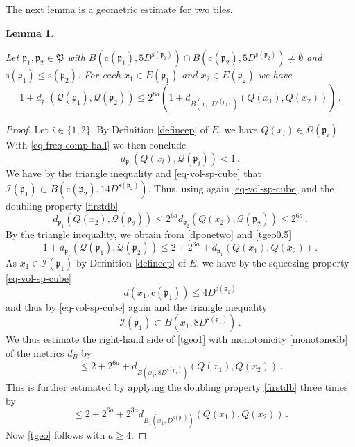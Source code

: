\documentclass[10pt,a4paper]{article}
\theoremstyle{plain}
\newtheorem{lemma}[theorem]{Lemma}
\theoremstyle{definition}
\numberwithin{equation}{subsection}
\newcommand{\fp}{{\mathfrak p}}
\newcommand{\fP}{{\mathfrak P}}
\newcommand{\pc}{{\mathrm{c}}}
\newcommand{\ps}{{\mathrm{s}}}
\newcommand{\fc}{{\Omega}}
\newcommand{\scI}{{\mathcal{I}}} %
\newcommand{\tQ}{{Q}}
\newcommand{\fcc}{{\mathcal{Q}}}
\newcommand{\lean}[1]{}
\newcommand{\uses}[1]{}
\newcommand{\leanok}{}
\begin{document}
The next lemma is a geometric estimate for two tiles.
\begin{lemma}\label{tile-uncertainty}
\leanok
\lean{Tile.uncertainty}
\uses{monotone-cube-metrics,tile-range-support}
    Let $\fp_1, \fp_2\in \fP$ with
    $B(\pc(\fp_1),5D^{\ps(\fp_1)}) \cap B(\pc(\fp_2),5D^{\ps(\fp_2)}) \ne \emptyset$ and
$\ps({\fp_1})\leq \ps({\fp_2})$. For each $x_1\in E(\fp_1)$ and
$x_2\in E(\fp_2)$ we have
\begin{equation}\label{tgeo}
  1+d_{\fp_1}(\fcc(\fp_1), \fcc(\fp_2))\le
    2^{8a}(1 + d_{B(x_1, D^{\ps(\fp_1)})}(\tQ(x_1),\tQ(x_2)))\, .
\end{equation}
\end{lemma}
\begin{proof}
\leanok
Let $i\in \{1,2\}$.
By Definition \eqref{defineep} of $E$,
we have $\tQ(x_i)\in \fc(\fp_i)$
With \eqref{eq-freq-comp-ball} we then conclude
\begin{equation}\label{dponetwo}
    d_{\fp_i}(\tQ(x_i),\fcc(\fp_i)) < 1\, .
\end{equation}
We have by the triangle inequality and \eqref{eq-vol-sp-cube} that $\scI(\fp_1) \subset B(\pc(\fp_2),14D^{\ps(\fp_2)})$.
Thus, using again \eqref{eq-vol-sp-cube} and the doubling property \eqref{firstdb}
\begin{equation}\label{tgeo0.5}
    d_{\fp_1}(\tQ(x_2), \fcc(\fp_2)) \le 2^{6a} d_{\fp_2}(\tQ(x_2), \fcc(\fp_2)) \le 2^{6a}\,.
\end{equation}
By the triangle inequality, we obtain from \eqref{dponetwo} and
\eqref{tgeo0.5}
\begin{equation}\label{tgeo1}
     1+d_{\fp_1}(\fcc(\fp_1), \fcc(\fp_2))\le 2 + 2^{6a} +d_{\fp_1}(\tQ(x_1), \tQ(x_2))\, .
\end{equation}
As $x_1\in \scI(\fp_1)$ by Definition \eqref{defineep} of $E$, we have by the squeezing property \eqref{eq-vol-sp-cube}
\begin{equation}
    d(x_1,\pc(\fp_1))\le 4D^{\ps(\fp_1)}
\end{equation}
and thus by \eqref{eq-vol-sp-cube} again and the triangle inequality
\begin{equation}
    \scI(\fp_1)\subset B(x_1,8D^{\ps(\fp_1)})\, .
\end{equation}
We thus estimate the right-hand side of \eqref{tgeo1} with monotonicity \eqref{monotonedb} of the metrics $d_B$ by
\begin{equation}\label{tgeo1.5}
    \le 2 + 2^{6a} + d_{B(x_1,8D^{\ps(\fp_1)})}(\tQ(x_1), \tQ(x_2))\, .
\end{equation}
This is further estimated by applying the doubling property \eqref{firstdb} three times by
\begin{equation}\label{tgeo2}
    \le 2 + 2^{6a} +2^{3a}d_{B_1(x_1, D^{\ps(\fp_1)})}(\tQ(x_1), \tQ(x_2))\, .
\end{equation}
Now \eqref{tgeo} follows with $a\ge 4$.
\end{proof}
\end{document}
